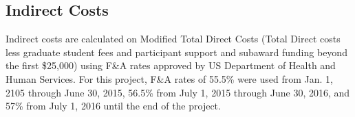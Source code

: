 \subsection*{Indirect Costs}
Indirect costs are calculated on Modified Total Direct Costs (Total Direct costs less graduate student fees and participant support and subaward funding beyond the first \$25,000) using F\&A rates approved by US Department of Health and Human Services. For this project, F\&A rates of 55.5\% were used from Jan. 1, 2105 through June 30, 2015, 56.5\% from July 1, 2015 through June 30, 2016, and 57\% from July 1, 2016 until the end of the project.



